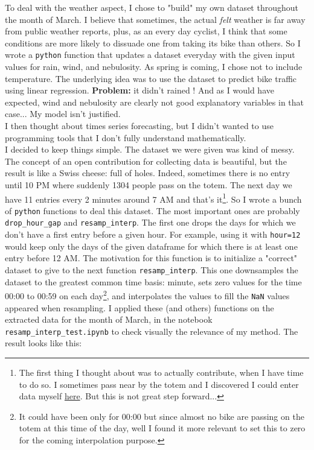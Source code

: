 \documentclass[11pt,a4paper]{article}
\begin{document}
To deal with the weather aspect, I chose to "build" my own dataset throughout the month of March. I believe that sometimes, the actual \textit{felt} weather is far away from public weather reports, plus, as an every day cyclist, I think that some conditions are more likely to dissuade one from taking its bike than others. So I wrote a \texttt{python} function that updates a dataset everyday with the given input values for rain, wind, and nebulosity. As spring is coming, I chose not to include temperature. The underlying idea was to use the dataset to predict bike traffic using linear regression. \textbf{Problem:} it didn't rained ! And as I would have expected, wind and nebulosity are clearly not good explanatory variables in that case... My model isn't justified.\\

I then thought about times series forecasting, but I didn't wanted to use programming tools that I don't fully understand mathematically.\\

I decided to keep things simple. The dataset we were given was kind of messy. The concept of an open contribution for collecting data is beautiful, but the result is like a Swiss cheese: full of holes. Indeed, sometimes there is no entry until 10 PM where suddenly 1304 people pass on the totem. The next day we have 11 entries every 2 minutes around 7 AM and that's it\footnote{The first thing I thought about was to actually contribute, when I have time to do so. I sometimes pass near by the totem and I discovered I could enter data myself \href{https://docs.google.com/forms/d/e/1FAIpQLSfPHrWpHSj0A0VHzkaBlvSYCgUBQQyQOPOJ6lhq0dIDLvcDlg/viewform}{here}. But this is not great step forward...}.
So I wrote a bunch of \texttt{python} functions to deal this dataset. The most important ones are probably \texttt{drop\_hour\_gap} and \texttt{resamp\_interp}. The first one drops the days for which we don't have a first entry before a given hour. For example, using it with \texttt{hour=12} would keep only the days of the given dataframe for which there is at least one entry before 12 AM. The motivation for this function is to initialize a "correct" dataset to give to the next function \texttt{resamp\_interp}. This one downsamples the dataset to the greatest common time basis: minute, sets zero values for the time 00:00 to 00:59 on each day\footnote{It could have been only for 00:00 but since almost no bike are passing on the totem at this time of the day, well I found it more relevant to set this to zero for the coming interpolation purpose.}, and interpolates the values to fill the \texttt{NaN} values appeared when resampling. I applied these (and others) functions on the extracted data for the month of March, in the notebook \texttt{resamp\_interp\_test.ipynb} to check visually the relevance of my method. The result looks like this:\\
\end{document}
